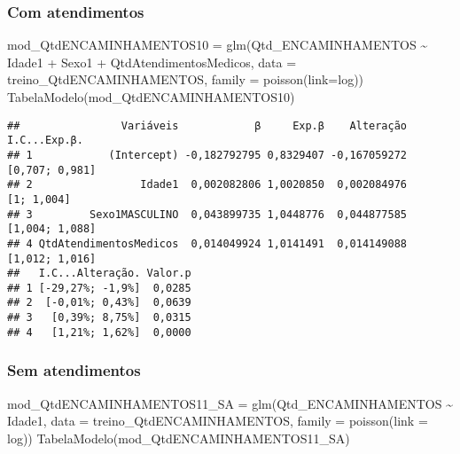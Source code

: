 \documentclass[
]{article}
\newenvironment{Shaded}{\begin{snugshade}}{\end{snugshade}}
\newcommand{\AttributeTok}[1]{\textcolor[rgb]{0.77,0.63,0.00}{#1}}
\newcommand{\FunctionTok}[1]{\textcolor[rgb]{0.00,0.00,0.00}{#1}}
\newcommand{\NormalTok}[1]{#1}
\newcommand{\OtherTok}[1]{\textcolor[rgb]{0.56,0.35,0.01}{#1}}
\newcommand{\SpecialCharTok}[1]{\textcolor[rgb]{0.00,0.00,0.00}{#1}}
\newcommand{\StringTok}[1]{\textcolor[rgb]{0.31,0.60,0.02}{#1}}
\begin{document}
\hypertarget{com-atendimentos-2}{%
\subsubsection{Com atendimentos}\label{com-atendimentos-2}}

\begin{Shaded}
\begin{Highlighting}[]
\NormalTok{mod\_QtdENCAMINHAMENTOS10 }\OtherTok{=} \FunctionTok{glm}\NormalTok{(Qtd\_ENCAMINHAMENTOS }\SpecialCharTok{\textasciitilde{}}\NormalTok{ Idade1 }\SpecialCharTok{+}\NormalTok{ Sexo1 }\SpecialCharTok{+} 
\NormalTok{                                QtdAtendimentosMedicos, }\AttributeTok{data =}\NormalTok{ treino\_QtdENCAMINHAMENTOS, }\AttributeTok{family =} \FunctionTok{poisson}\NormalTok{(}\AttributeTok{link=}\StringTok{\textquotesingle{}log\textquotesingle{}}\NormalTok{))}
\FunctionTok{TabelaModelo}\NormalTok{(mod\_QtdENCAMINHAMENTOS10)}
\end{Highlighting}
\end{Shaded}

\begin{verbatim}
##                Variáveis            β     Exp.β    Alteração   I.C...Exp.β.
## 1            (Intercept) -0,182792795 0,8329407 -0,167059272 [0,707; 0,981]
## 2                 Idade1  0,002082806 1,0020850  0,002084976     [1; 1,004]
## 3         Sexo1MASCULINO  0,043899735 1,0448776  0,044877585 [1,004; 1,088]
## 4 QtdAtendimentosMedicos  0,014049924 1,0141491  0,014149088 [1,012; 1,016]
##   I.C...Alteração. Valor.p
## 1 [-29,27%; -1,9%]  0,0285
## 2  [-0,01%; 0,43%]  0,0639
## 3   [0,39%; 8,75%]  0,0315
## 4   [1,21%; 1,62%]  0,0000
\end{verbatim}

\hypertarget{sem-atendimentos-2}{%
\subsubsection{Sem atendimentos}\label{sem-atendimentos-2}}

\begin{Shaded}
\begin{Highlighting}[]
\NormalTok{mod\_QtdENCAMINHAMENTOS11\_SA }\OtherTok{=} \FunctionTok{glm}\NormalTok{(Qtd\_ENCAMINHAMENTOS }\SpecialCharTok{\textasciitilde{}}\NormalTok{ Idade1, }\AttributeTok{data =}\NormalTok{ treino\_QtdENCAMINHAMENTOS, }\AttributeTok{family =} \FunctionTok{poisson}\NormalTok{(}\AttributeTok{link =} \StringTok{\textquotesingle{}log\textquotesingle{}}\NormalTok{))}
\FunctionTok{TabelaModelo}\NormalTok{(mod\_QtdENCAMINHAMENTOS11\_SA)}
\end{Highlighting}
\end{Shaded}
\end{document}
